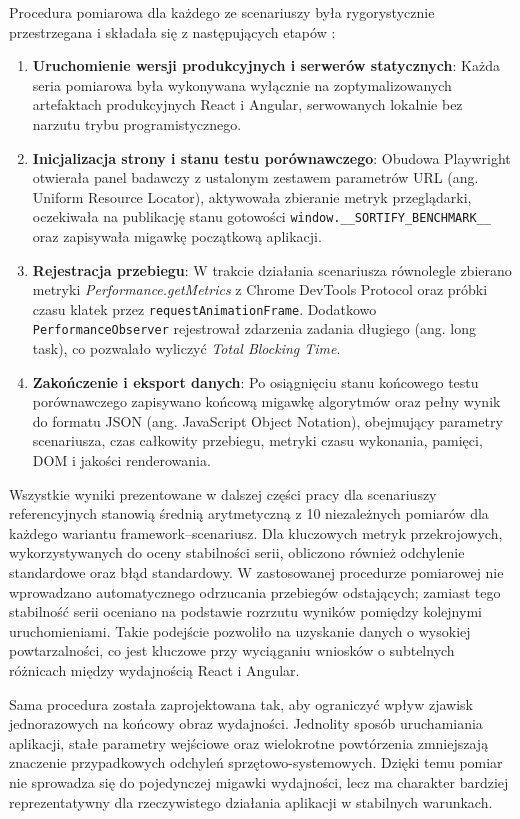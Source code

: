 \documentclass[12pt,openright,twoside]{report}
\begin{document}
Procedura pomiarowa dla każdego ze scenariuszy była rygorystycznie przestrzegana i składała się z następujących etapów \cite{Chrome_Runtime_Performance}:
\begin{enumerate}
  \item \textbf{Uruchomienie wersji produkcyjnych i serwerów statycznych}: Każda seria pomiarowa była wykonywana wyłącznie na zoptymalizowanych artefaktach produkcyjnych React i Angular, serwowanych lokalnie bez narzutu trybu programistycznego.
  \item \textbf{Inicjalizacja strony i stanu testu porównawczego}: Obudowa Playwright otwierała panel badawczy z ustalonym zestawem parametrów URL (ang. Uniform Resource Locator), aktywowała zbieranie metryk przeglądarki, oczekiwała na publikację stanu gotowości \texttt{window.\_\_SORTIFY\_BENCHMARK\_\_} oraz zapisywała migawkę początkową aplikacji.
  \item \textbf{Rejestracja przebiegu}: W trakcie działania scenariusza równolegle zbierano metryki \textit{Performance.getMetrics} z Chrome DevTools Protocol oraz próbki czasu klatek przez \texttt{requestAnimationFrame}. Dodatkowo \texttt{PerformanceObserver} rejestrował zdarzenia zadania długiego (ang. long task), co pozwalało wyliczyć \textit{Total Blocking Time}.
  \item \textbf{Zakończenie i eksport danych}: Po osiągnięciu stanu końcowego testu porównawczego zapisywano końcową migawkę algorytmów oraz pełny wynik do formatu JSON (ang. JavaScript Object Notation), obejmujący parametry scenariusza, czas całkowity przebiegu, metryki czasu wykonania, pamięci, DOM i jakości renderowania.
\end{enumerate}

Wszystkie wyniki prezentowane w dalszej części pracy dla scenariuszy referencyjnych stanowią średnią arytmetyczną z 10 niezależnych pomiarów dla każdego wariantu framework--scenariusz. Dla kluczowych metryk przekrojowych, wykorzystywanych do oceny stabilności serii, obliczono również odchylenie standardowe oraz błąd standardowy. W zastosowanej procedurze pomiarowej nie wprowadzano automatycznego odrzucania przebiegów odstających; zamiast tego stabilność serii oceniano na podstawie rozrzutu wyników pomiędzy kolejnymi uruchomieniami. Takie podejście pozwoliło na uzyskanie danych o wysokiej powtarzalności, co jest kluczowe przy wyciąganiu wniosków o subtelnych różnicach między wydajnością React i Angular.

Sama procedura została zaprojektowana tak, aby ograniczyć wpływ zjawisk jednorazowych na końcowy obraz wydajności. Jednolity sposób uruchamiania aplikacji, stałe parametry wejściowe oraz wielokrotne powtórzenia zmniejszają znaczenie przypadkowych odchyleń sprzętowo-systemowych. Dzięki temu pomiar nie sprowadza się do pojedynczej migawki wydajności, lecz ma charakter bardziej reprezentatywny dla rzeczywistego działania aplikacji w stabilnych warunkach.
\end{document}

